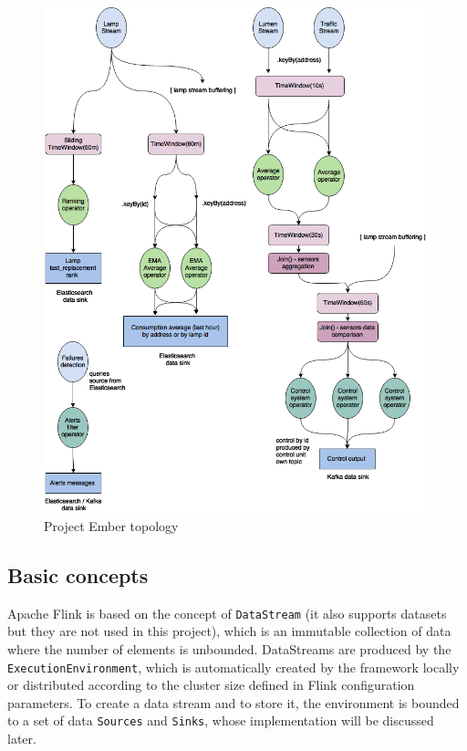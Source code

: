 \begin{figure}
\begin{center}
	\includegraphics[scale=0.3]{img/ember_topology}
	\caption{Project Ember topology}
	\label{fig:ember_topology}
\end{center}
\end{figure}

\subsection{Basic concepts}
Apache Flink is based on the concept of \texttt{DataStream} (it also supports datasets but they are not used in this project), which is an immutable collection of data where the number of elements is unbounded. 
DataStreams are produced by the \texttt{ExecutionEnvironment}, which is automatically created by the framework locally or distributed according to the cluster size defined in Flink configuration parameters. To create a data stream and to store it, the environment is bounded to a set of data \texttt{Sources} and \texttt{Sinks}, whose implementation will be discussed later.

